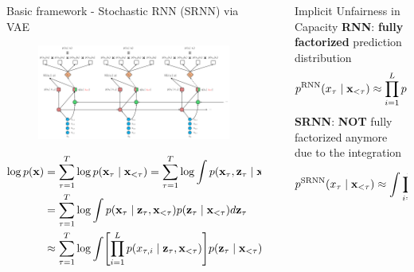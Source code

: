 \documentclass[final]{beamer}
\newlength{\sepwidth}
\newlength{\colwidth}
\newcommand{\separatorcolumn}{\begin{column}{\sepwidth}\end{column}}
\begin{document}
\begin{frame}[t]
\begin{columns}[t]
\begin{column}{\colwidth}
  \begin{block}{Basic framework - Stochastic RNN (SRNN) via VAE}
	\begin{figure}
	\includegraphics[width=0.85\linewidth]{fig/SRNN-L4-ELBO.pdf} %
	\end{figure}
	\vspace{-1em}
	\begin{align*}
	\log p(\rvx) 
	&= \sum_{\tau=1}^{T} \log p(\rvx_{\tau} \mid \rvx_{<\tau}) 
	= \sum_{\tau=1}^{T} \log \int p(\rvx_{\tau}, \rvz_\tau \mid \rvx_{<\tau}) d\rvz_\tau && \text{(add $\rvz_\tau$ for each $\rvx_\tau$)} \\
	&= \sum_{\tau=1}^{T} \log \int p(\rvx_{\tau} \mid \rvz_\tau , \rvx_{<\tau}) p(\rvz_\tau \mid \rvx_{<\tau}) d\rvz_\tau && \text{(product rule)} \\
	&\approx \sum_{\tau=1}^{T} \log \int \sbr{ \prod_{i=1}^{L} p(x_{\tau,i} \mid \rvz_\tau , \rvx_{<\tau}) } p(\rvz_\tau \mid \rvx_{<\tau}) d\rvz_\tau && \text{(factorized)}
	\end{align*}
\end{block}
\end{column}

\separatorcolumn

\begin{column}{\colwidth}


\begin{block}{Implicit Unfairness in Capacity}
 	\textbf{RNN}: \textbf{fully factorized} prediction distribution
 	\[ 
 		p^\text{RNN}(x_{\tau} \mid {\mathbf{x}}_{<\tau}) \approx \prod_{i=1}^{L} p(x_{\tau,i} \mid {\mathbf{x}}_{<\tau})
 	\]
 	\textbf{SRNN}: \textbf{NOT} fully factorized anymore due to the integration
 	\[
 		p^\text{SRNN}(x_{\tau} \mid {\mathbf{x}}_{<\tau}) \approx \int  \prod_{i=1}^{L} p(x_{\tau,i} \mid {\mathbf{x}}_{<\tau}, {\mathbf{z}}_\tau) p({\mathbf{z}}_\tau \mid {\mathbf{x}}_{< \tau}) d {\mathbf{z}}_\tau
 	\]
 	

\end{block}
\end{column}
\end{columns}
\end{frame}
\end{document}
